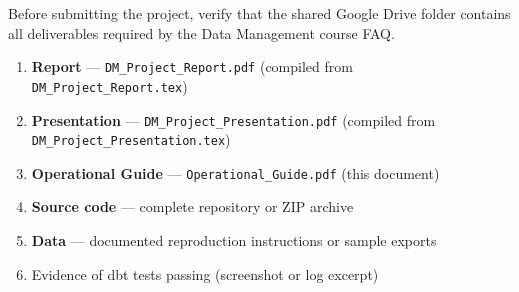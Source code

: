 \documentclass[11pt,a4paper]{article}
\begin{document}
\begin{tcolorbox}[infobox]
Before submitting the project, verify that the shared Google Drive folder contains
all deliverables required by the Data Management course FAQ.
\end{tcolorbox}

\begin{enumerate}[label=\textbf{\arabic*.},leftmargin=28pt]
  \item[$\square$] \textbf{Report} — \texttt{DM\_Project\_Report.pdf} (compiled from \texttt{DM\_Project\_Report.tex})
  \item[$\square$] \textbf{Presentation} — \texttt{DM\_Project\_Presentation.pdf} (compiled from \texttt{DM\_Project\_Presentation.tex})
  \item[$\square$] \textbf{Operational Guide} — \texttt{Operational\_Guide.pdf} (this document)
  \item[$\square$] \textbf{Source code} — complete repository or ZIP archive
  \item[$\square$] \textbf{Data} — documented reproduction instructions or sample exports
  \item[$\square$] Evidence of dbt tests passing (screenshot or log excerpt)
\end{enumerate}
\end{document}
